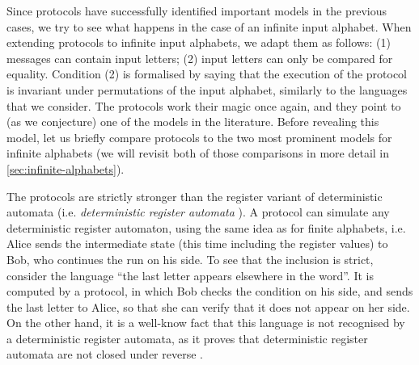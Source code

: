 Since protocols have successfully identified important models in the previous
cases, we try to see  what happens in the case of an infinite input alphabet.
When extending protocols to infinite input alphabets, we adapt them as follows:
(1) messages can contain input letters; (2)  input letters can only be compared for
equality. Condition (2) is formalised by saying that the execution of the
protocol is invariant under permutations of the input alphabet, similarly to
the languages that we consider. The protocols  work their magic once again, and
they point to (as we conjecture)  one of the models in the literature. Before
revealing this model, let us briefly compare protocols to the two most prominent models 
for infinite alphabets
(we will revisit both of those comparisons in more detail in \cref{sec:infinite-alphabets}).

\begin{myexample}\label{ex:reg-det-too-weak}
    The protocols are strictly stronger than the register variant of deterministic automata
    (i.e. \emph{deterministic register automata} \cite[Definition~3]{kaminskiFiniteMemoryAutomata1994}).
    A protocol can simulate any deterministic register automaton, using the same idea as for finite alphabets,
    i.e. Alice sends the intermediate state (this time including the register values) to Bob, who 
    continues the run on his side. To see that the inclusion is strict, consider the language
    ``the last letter appears elsewhere in the word''. It is computed by a protocol, 
    in which Bob checks the condition on his side, and sends the last letter to Alice, so that she can verify
    that it does not appear on her side. On the other hand, it is a well-know fact that this language
    is not recognised by a deterministic register automata, as it proves that deterministic register automata 
    are not closed under reverse \cite[Examples~4~and~8]{kaminskiFiniteMemoryAutomata1994}. 
\end{myexample}




